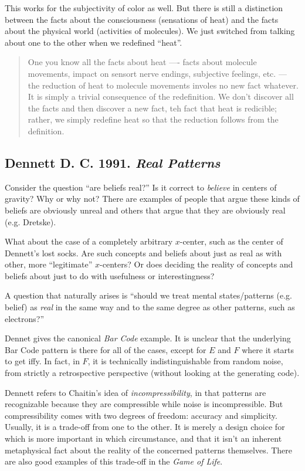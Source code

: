\documentclass{article}
\newcommand{\ti}[1]{\textit{#1}}
\newcommand{\annbibtitle}[2]{\subsection*{#1. \ti{#2}}}
\begin{document}
This works for the subjectivity of color as well. But there is still a distinction between the facts about the consciousness (sensations of heat) and the facts about the physical world (activities of molecules). We just switched from talking about one to the other when we redefined ``heat''.

\begin{quote}
One you know all the facts about heat ---- facts about molecule movements, impact on sensort nerve endings, subjective feelings, etc. --- the reduction of heat to molecule movements involes no new fact whatever. It is simply a trivial consequence of the redefinition. We don't discover all the facts and then discover a new fact, teh fact that heat is redicible; rather, we simply redefine heat so that the reduction follows from the definition.
\end{quote}


\annbibtitle{Dennett D. C. 1991}{Real Patterns}

Consider the question ``are beliefs real?'' Is it correct to \ti{believe} in centers of gravity? Why or why not? There are examples of people that argue these kinds of beliefs are obviously unreal and others that argue that they are obviously real (e.g. Dretske).

What about the case of a completely arbitrary $x$-center, such as the center of Dennett's lost socks. Are such concepts and beliefs about just as real as with other, more ``legitimate'' $x$-centers? Or does deciding the reality of concepts and beliefs about just to do with usefulness or interestingness?

A question that naturally arises is ``should we treat mental states/patterns (e.g. belief) as \ti{real} in the same way and to the same degree as other patterns, such as electrons?''

Dennet gives the canonical \ti{Bar Code} example. It is unclear that the underlying Bar Code pattern is there for all of the cases, except for $E$ and $F$ where it starts to get iffy. In fact, in $F$, it is technically indistinguishable from random noise, from strictly a retrospective perspective (without looking at the generating code).

Dennett refers to Chaitin's idea of \ti{incompressibility}, in that patterns are recognizable because they are compressible while noise is incompressible. But compressibility comes with two degrees of freedom: accuracy and simplicity. Usually, it is a trade-off from one to the other. It is merely a design choice for which is more important in which circumstance, and that it isn't an inherent metaphysical fact about the reality of the concerned patterns themselves. There are also good examples of this trade-off in the \ti{Game of Life}.
\end{document}
